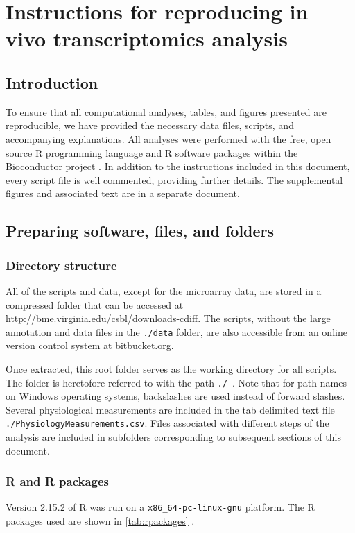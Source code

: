 \chapter[Reproducing in vivo analyses]{Instructions for reproducing in vivo transcriptomics analysis}

\section{Introduction}\label{S:Intro3}
To ensure that all computational analyses, tables, and figures
presented are reproducible, we have provided the necessary data
files, scripts, and accompanying explanations. All analyses 
were performed with the free, open source R programming language
and R software packages within the Bioconductor project \cite{Gentleman:2004tt}. 
In addition
to the instructions included in this document, every script file
is well commented, providing further details. The supplemental figures
and associated text are in a separate document. 

\section{Preparing software, files, and folders}\label{S:Files} 

\subsection{Directory structure}
All of the scripts and data, except for the microarray data, are stored 
in a compressed folder that can be accessed at
\url{http://bme.virginia.edu/csbl/downloads-cdiff}. The scripts,
without the large annotation and data files in the \texttt{./data} folder, 
are also accessible from an online version control system at 
\href{https://bitbucket.org/kdauria/cdiff}{bitbucket.org}.

Once extracted, this root folder serves as the working 
directory for all scripts. The folder is heretofore
referred to with the path \texttt{./}~. Note that for path
names on Windows operating systems, backslashes are used instead of
forward slashes. Several physiological measurements are
included in the tab delimited text file
\texttt{./PhysiologyMeasurements.csv}. Files associated with 
different steps of the analysis are included
in subfolders corresponding to subsequent sections of this document.

\subsection{R and R packages}
Version 2.15.2 of R was run on a \texttt{x86\_{}64-pc-linux-gnu} platform. 
The R packages used are shown in \autoref{tab:rpackages} \cite{Gautier:2004kv,Bolstad:2003ia,Durinck:2009ki,Wickham:2009ft,Smyth:2005ht,Wickham:2007tu}.

